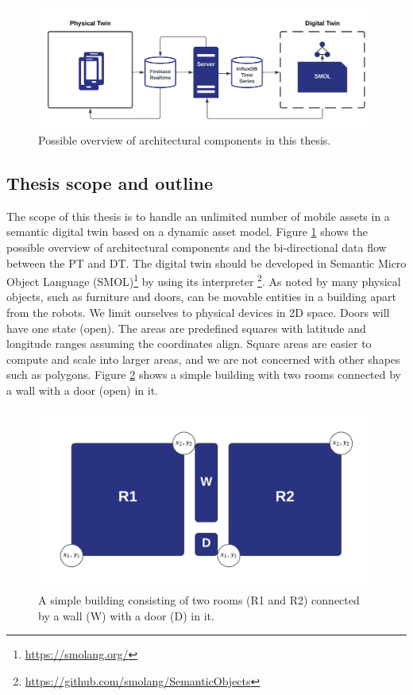 \documentclass{article}
\begin{document}
\begin{figure}[!h]
    \centering
    \includegraphics[scale=0.12]{graphics/thesis_overview.png}
    \caption{Possible overview of architectural components in this thesis.}
    \label{fig:components}
\end{figure}


\subsection{Thesis scope and outline}
The scope of this thesis is to handle an unlimited number of mobile assets in a semantic digital twin based on a dynamic asset model. Figure \ref{fig:components} shows the possible overview of architectural components and the bi-directional data flow between the PT and DT. The digital twin should be developed in Semantic Micro Object Language (SMOL)\footnote{\url{https://smolang.org/}} by using its interpreter \footnote{\url{https://github.com/smolang/SemanticObjects}}.
As noted by \citeauthor{pauwels_live_2023} many physical objects, such as furniture and doors, can be movable entities in a building apart from the robots. We limit ourselves to physical devices in 2D space. Doors will have one state (open). The areas are predefined squares with latitude and longitude ranges assuming the coordinates align. Square areas are easier to compute and scale into larger areas, and we are not concerned with other shapes such as polygons.\newline
Figure \ref{fig:simple_building} shows a simple building with two rooms connected by a wall with a door (open) in it.

\begin{figure}[!h]
    \centering
    \includegraphics[scale=0.3]{graphics/simple_building.png}
    \caption{A simple building consisting of two rooms (R1 and R2) connected by a wall (W) with a door (D) in it.}
    \label{fig:simple_building}
\end{figure}
\end{document}
